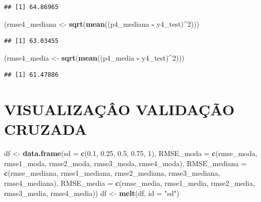 \documentclass[]{article}
\newenvironment{Shaded}{\begin{snugshade}}{\end{snugshade}}
\newcommand{\KeywordTok}[1]{\textcolor[rgb]{0.13,0.29,0.53}{\textbf{#1}}}
\newcommand{\DataTypeTok}[1]{\textcolor[rgb]{0.13,0.29,0.53}{#1}}
\newcommand{\DecValTok}[1]{\textcolor[rgb]{0.00,0.00,0.81}{#1}}
\newcommand{\FloatTok}[1]{\textcolor[rgb]{0.00,0.00,0.81}{#1}}
\newcommand{\StringTok}[1]{\textcolor[rgb]{0.31,0.60,0.02}{#1}}
\newcommand{\OperatorTok}[1]{\textcolor[rgb]{0.81,0.36,0.00}{\textbf{#1}}}
\newcommand{\NormalTok}[1]{#1}
\begin{document}
\begin{verbatim}
## [1] 64.86965
\end{verbatim}

\begin{Shaded}
\begin{Highlighting}[]
\NormalTok{(rmse4_mediana <-}\StringTok{ }\KeywordTok{sqrt}\NormalTok{(}\KeywordTok{mean}\NormalTok{((p4_mediana }\OperatorTok{-}\StringTok{ }\NormalTok{y4_test)}\OperatorTok{^}\DecValTok{2}\NormalTok{)))}
\end{Highlighting}
\end{Shaded}

\begin{verbatim}
## [1] 63.03455
\end{verbatim}

\begin{Shaded}
\begin{Highlighting}[]
\NormalTok{(rmse4_media <-}\StringTok{ }\KeywordTok{sqrt}\NormalTok{(}\KeywordTok{mean}\NormalTok{((p4_media }\OperatorTok{-}\StringTok{ }\NormalTok{y4_test)}\OperatorTok{^}\DecValTok{2}\NormalTok{)))}
\end{Highlighting}
\end{Shaded}

\begin{verbatim}
## [1] 61.47886
\end{verbatim}

\section{VISUALIZAÇÂO VALIDAÇÃO
CRUZADA}\label{visualizacao-validacao-cruzada}

\begin{Shaded}
\begin{Highlighting}[]
\NormalTok{df <-}\StringTok{ }\KeywordTok{data.frame}\NormalTok{(}\DataTypeTok{sd =} \KeywordTok{c}\NormalTok{(}\FloatTok{0.1}\NormalTok{, }\FloatTok{0.25}\NormalTok{, }\FloatTok{0.5}\NormalTok{, }\FloatTok{0.75}\NormalTok{, }\DecValTok{1}\NormalTok{),}
                 \DataTypeTok{RMSE_moda =} \KeywordTok{c}\NormalTok{(rmse_moda, rmse1_moda, rmse2_moda, rmse3_moda, }
\NormalTok{                               rmse4_moda),}
                 \DataTypeTok{RMSE_mediana =} \KeywordTok{c}\NormalTok{(rmse_mediana, rmse1_mediana, rmse2_mediana, }
\NormalTok{                                  rmse3_mediana, rmse4_mediana),}
                 \DataTypeTok{RMSE_media =} \KeywordTok{c}\NormalTok{(rmse_media, rmse1_media, rmse2_media, }
\NormalTok{                                rmse3_media, rmse4_media))}
\NormalTok{df <-}\StringTok{ }\KeywordTok{melt}\NormalTok{(df, }\DataTypeTok{id =} \StringTok{"sd"}\NormalTok{)}
\end{Highlighting}
\end{Shaded}
\end{document}
